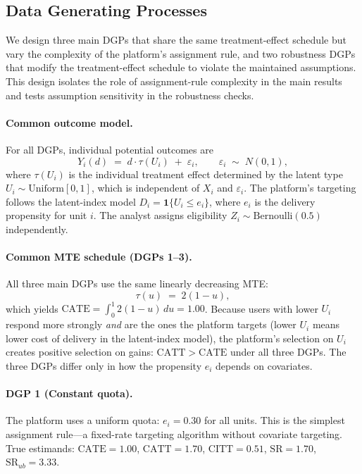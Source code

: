 \documentclass[11pt]{article}
\begin{document}
\subsection{Data Generating Processes}
\label{subsec:dgp}

We design three main DGPs that share the same treatment-effect schedule but vary
the complexity of the platform's assignment rule, and two robustness DGPs that
modify the treatment-effect schedule to violate the maintained assumptions.  This
design isolates the role of assignment-rule complexity in the main results and
tests assumption sensitivity in the robustness checks.

\paragraph{Common outcome model.} For all DGPs, individual potential outcomes are
\begin{equation}
  Y_i(d) \;=\; d\cdot\tau(U_i) \;+\; \varepsilon_i, \qquad
  \varepsilon_i \;\sim\; N(0,1),
  \label{eq:dgp_outcome}
\end{equation}
where $\tau(U_i)$ is the individual treatment effect determined by the latent
type $U_i \sim \mathrm{Uniform}[0,1]$, which is independent of $X_i$ and
$\varepsilon_i$.  The platform's targeting follows the latent-index model
$D_i = \mathbf{1}\{U_i \leq e_i\}$, where $e_i$ is the delivery propensity
for unit $i$.  The analyst assigns eligibility $Z_i \sim \mathrm{Bernoulli}(0.5)$
independently.

\paragraph{Common MTE schedule (DGPs 1--3).}
All three main DGPs use the same linearly decreasing MTE:
\[
  \tau(u) \;=\; 2(1 - u),
\]
which yields $\mathrm{CATE} = \int_0^1 2(1-u)\,du = 1.00$.  Because users with
lower $U_i$ respond more strongly \emph{and} are the ones the platform targets
(lower $U_i$ means lower cost of delivery in the latent-index model), the
platform's selection on $U_i$ creates positive selection on gains:
$\mathrm{CATT} > \mathrm{CATE}$ under all three DGPs.  The three DGPs differ
only in how the propensity $e_i$ depends on covariates.

\paragraph{DGP 1 (Constant quota).}
The platform uses a uniform quota: $e_i = 0.30$ for all units.  This is the
simplest assignment rule---a fixed-rate targeting algorithm without covariate
targeting.  True estimands: $\mathrm{CATE} = 1.00$, $\mathrm{CATT} = 1.70$,
$\mathrm{CITT} = 0.51$, $\mathrm{SR} = 1.70$, $\mathrm{SR}_{ub} = 3.33$.
\end{document}
